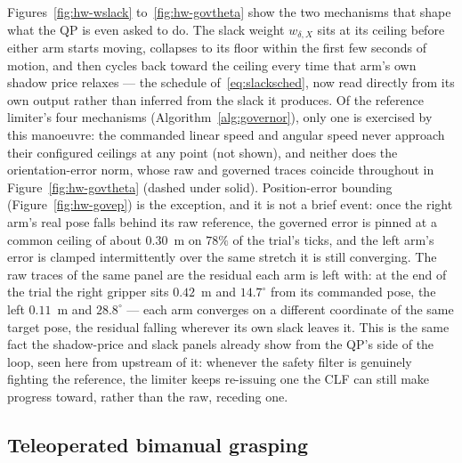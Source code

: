 Figures~\ref{fig:hw-wslack} to~\ref{fig:hw-govtheta} show the two mechanisms that shape what the QP is even asked to do. The slack weight $w_{\delta,X}$ sits at its ceiling before either arm starts moving, collapses to its floor within the first few seconds of motion, and then cycles back toward the ceiling every time that arm's own shadow price relaxes --- the schedule of~\eqref{eq:slacksched}, now read directly from its own output rather than inferred from the slack it produces. Of the reference limiter's four mechanisms (Algorithm~\ref{alg:governor}), only one is exercised by this manoeuvre: the commanded linear speed and angular speed never approach their configured ceilings at any point (not shown), and neither does the orientation-error norm, whose raw and governed traces coincide throughout in Figure~\ref{fig:hw-govtheta} (dashed under solid). Position-error bounding (Figure~\ref{fig:hw-govep}) is the exception, and it is not a brief event: once the right arm's real pose falls behind its raw reference, the governed error is pinned at a common ceiling of about $0.30$~m on $78\%$ of the trial's ticks, and the left arm's error is clamped intermittently over the same stretch it is still converging. The raw traces of the same panel are the residual each arm is left with: at the end of the trial the right gripper sits $0.42$~m and $14.7^{\circ}$ from its commanded pose, the left $0.11$~m and $28.8^{\circ}$ --- each arm converges on a different coordinate of the same target pose, the residual falling wherever its own slack leaves it. This is the same fact the shadow-price and slack panels already show from the QP's side of the loop, seen here from upstream of it: whenever the safety filter is genuinely fighting the reference, the limiter keeps re-issuing one the CLF can still make progress toward, rather than the raw, receding one.

\subsection{Teleoperated bimanual grasping}
\label{sec:hwteleop}

